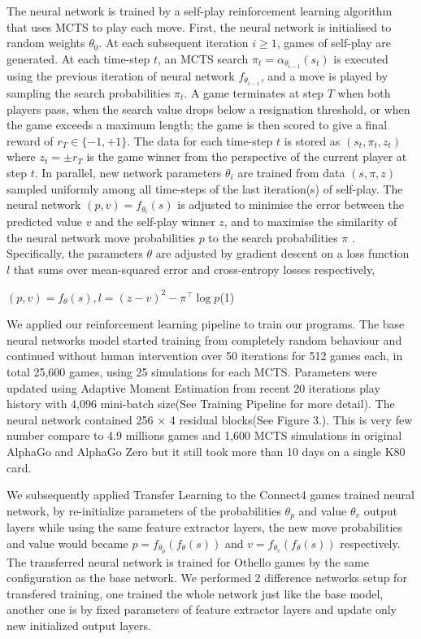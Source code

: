 \documentclass[12pt,a4paper]{article}
\begin{document}
The neural network is trained by a self-play reinforcement learning algorithm that uses MCTS to play each move. First, the neural network is initialised to random weights \(\theta_0\). At each subsequent iteration \(i \geq 1\), games of self-play are generated. At each time-step \(t\), an MCTS search \(\pi_t = \alpha_{\theta_{i−1}}(s_t)\) is executed using the previous iteration of neural network \(f_{\theta_{i−1}}\), and a move is played by sampling the search probabilities \(\pi_t\). A game terminates at step \(T\) when both players pass, when the search value drops below a resignation threshold, or when the game exceeds a maximum length; the game is then scored to give a final reward of \(r_T \in \{−1, +1\}\). The data for each time-step \(t\) is stored as \((s_t, \pi_t, z_t)\) where \(z_t = \pm r_T\) is the game winner from the perspective of the current player at step \(t\). In parallel, new network parameters \(\theta_i\) are trained from data \((s, \pi, z)\) sampled uniformly among all time-steps of the last iteration(s) of self-play. The neural network \((p, v) = f_{\theta_i}(s)\) is adjusted to minimise the error between the predicted value \(v\) and the self-play winner \(z\), and to maximise the similarity of the neural network move probabilities \(p\) to the search probabilities \(\pi\) . Specifically, the parameters \(\theta\) are adjusted by gradient descent on a loss function \(l\) that sums over mean-squared error and cross-entropy losses respectively,\par
\begin{flushleft}\hspace{4.5cm} \((p, v) = f_θ(s),\)\hspace{1cm}\(l = (z − v)^2 − \pi^\top \log p\)\hfill(1) \end{flushleft} \par
We applied our reinforcement learning pipeline to train our programs. The base neural networks model started training from completely random behaviour and continued without human intervention over 50 iterations for 512 games each, in total 25,600 games, using 25 simulations for each MCTS. Parameters were updated using Adaptive Moment Estimation\cite{Adam} from recent 20 iterations play history with 4,096 mini-batch size(See Training Pipeline for more detail). The neural network contained 256 × 4 residual blocks(See Figure 3.). This is very few number compare to 4.9 millions games and 1,600 MCTS simulations in original AlphaGo and AlphaGo Zero but it still took more than 10 days on a single K80 card.\par
We subsequently applied Transfer Learning to the Connect4 games trained neural network, by re-initialize parameters of the probabilities \(\theta_p\) and value \(\theta_v\) output layers while using the same feature extractor layers, the new move probabilities and value would became \(p = f_{\theta_p}(f_\theta(s))\) and \(v = f_{\theta_v}(f_\theta(s))\) respectively. The transferred neural network is trained for Othello games by the same configuration as the base network. We performed 2 difference networks setup for transfered training, one trained the whole network just like the base model, another one is by fixed parameters of feature extractor layers and update only new initialized output layers. 
\end{document}
